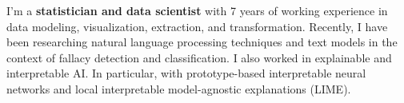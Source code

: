 \documentclass[10pt,a4paper,ragged2e,withhyper]{altacv}
\begin{document}

\makecvheader


I'm a \textbf{statistician and data scientist} with 7 years of working experience in data modeling, visualization, extraction, and transformation. 
Recently, I have been researching natural language processing techniques and text models in the context of fallacy detection and classification. I also worked in explainable and interpretable AI. In particular, with prototype-based interpretable neural networks and local interpretable model-agnostic explanations (LIME). 

\end{document}
